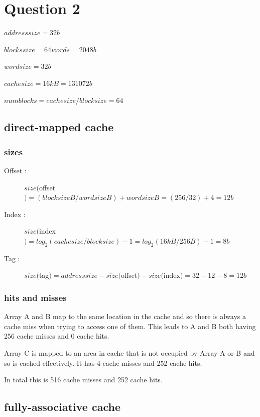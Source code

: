 \documentclass[12pt]{article}
\begin{document}
		\newpage
	
	\section{Question 2}

		$addresssize = 32 b$

		$blockssize = 64 words = 2048 b$

		$wordsize = 32b$

		$cachesize =  16kB = 131072 b$

		$numblocks = cachesize/blocksize = 64$


		\subsection{direct-mapped cache}

			\subsubsection{sizes}
				\begin{description}
					\item[Offset : ] $size($offset$) = (blocksize B/wordsize B) + wordsize B = (256/32) + 4 = 12b$
					\item[Index : ] $size($index$) = log_2(cachesize/blocksize) - 1 = log_2(16kB/256B) - 1 = 8b$
					\item[Tag : ] $size($tag$) = addresssize- size($offset$) - size($index$) = 32 - 12 - 8 = 12b$
				\end{description}

			\subsubsection{hits and misses}

				Array A and B map to the same location in the cache and so there is always a cache miss when trying to access one of them. This leads to A and B both having 256 cache misses and 0 cache hits. 

				Array C is mapped to an area in cache that is not occupied by Array A or B and so is cached effectively. It has 4 cache misses and 252 cache hits.

				In total this is 516 cache misses and 252 cache hits.
		\subsection{ fully-associative cache}
\end{document}

